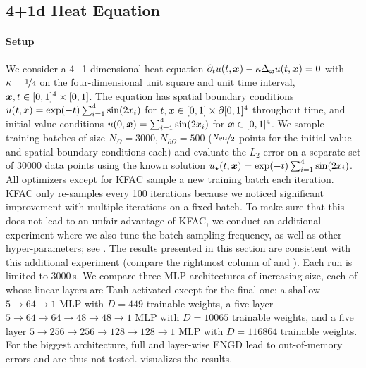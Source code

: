 \subsection{4+1d Heat Equation}\label{sec:4d-heat-app}

\paragraph{Setup} We consider a 4+1-dimensional heat equation $\partial_tu(t,{\bm{x}}) - \kappa \Delta_{{\bm{x}}} u(t, {\bm{x}}) = 0$ with $\kappa = \nicefrac{1}{4}$ on the four-dimensional unit square and unit time interval, ${\bm{x}}, t \in [0,1]^4 \times [0,1]$.
The equation has spatial boundary conditions $u(t, x) = \exp(-t) \sum_{i=1}^4 \sin( 2 {x}_i)$ for $t, {\bm{x}} \in [0,1] \times \partial [0,1]^4$ throughout time, and initial value conditions $u(0, {\bm{x}}) = \sum_{i=1}^4 \sin(2 {x}_i)$ for ${\bm{x}} \in [0,1]^4$.
We sample training batches of size $N_{\Omega} = \num{3000}, N_{\partial\Omega} = 500$ ($\nicefrac{N_{\partial\Omega}}{2}$ points for the initial value and spatial boundary conditions each) and evaluate the $L_2$ error on a separate set of $\num{30000}$ data points using the known solution $u_{\star}(t, {\bm{x}}) = \exp(-t) \sum_{i=1}^4 \sin(2 {x}_i)$.
All optimizers except for KFAC sample a new training batch each iteration.
KFAC only re-samples every 100 iterations because we noticed significant improvement with multiple iterations on a fixed batch.
To make sure that this does not lead to an unfair advantage of KFAC, we conduct an additional experiment where we also tune the batch sampling frequency, as well as other hyper-parameters; see .
The results presented in this section are consistent with this additional experiment (compare the rightmost column of  and ).
Each run is limited to 3000\,s.
We compare three MLP architectures of increasing size, each of whose linear layers are Tanh-activated except for the final one: a shallow $5\to 64\to 1$ MLP with $D=449$ trainable weights, a five layer $5 \to 64 \to 64 \to 48 \to 48 \to 1$ MLP with $D=\num{10065}$ trainable weights, and a five layer $5 \to 256 \to 256\to 128 \to 128 \to 1$ MLP with $D=\num{116864}$ trainable weights.
For the biggest architecture, full and layer-wise ENGD lead to out-of-memory errors and are thus not tested.
 visualizes the results.

